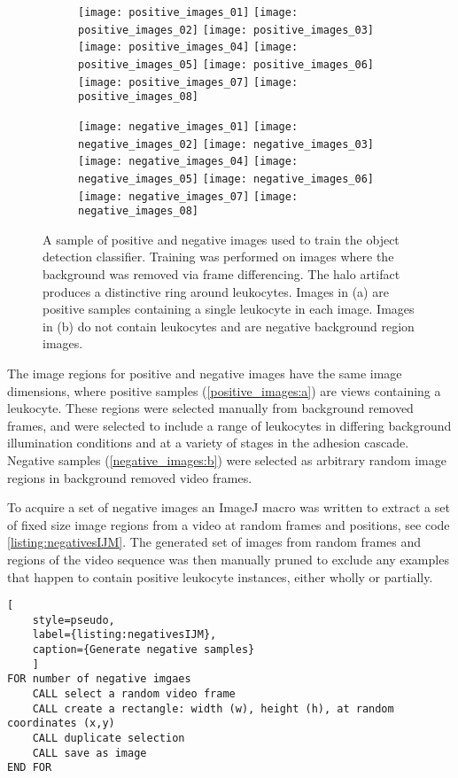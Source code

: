 \begin{figure}[htbp]{}
	\begin{subfigure}[b]{\linewidth}
		\centering
		\texttt{[image: positive\_images\_01]}
		\texttt{[image: positive\_images\_02]}
		\texttt{[image: positive\_images\_03]}
		\texttt{[image: positive\_images\_04]}
		\texttt{[image: positive\_images\_05]}
		\texttt{[image: positive\_images\_06]}
		\texttt{[image: positive\_images\_07]}
		\texttt{[image: positive\_images\_08]}
		\caption{}
		\label{positive_images:a}
	\end{subfigure}
	\begin{subfigure}[b]{\linewidth}
		\centering
		\texttt{[image: negative\_images\_01]}
		\texttt{[image: negative\_images\_02]}
		\texttt{[image: negative\_images\_03]}
		\texttt{[image: negative\_images\_04]}
		\texttt{[image: negative\_images\_05]}
		\texttt{[image: negative\_images\_06]}
		\texttt{[image: negative\_images\_07]}
		\texttt{[image: negative\_images\_08]}
		\caption{}
		\label{negative_images:b}
	\end{subfigure}
\caption[Classifier training samples]{A sample of positive and negative images used to train the object detection classifier. Training was performed on images where the background was removed via frame differencing. The halo artifact produces a distinctive ring around leukocytes. Images in (a) are positive samples containing a single leukocyte in each image. Images in (b) do not contain leukocytes and are negative background region images.}
\label{figure:classifier_samples}
\end{figure}

The image regions for positive and negative images have the same image dimensions, where positive samples (\autoref{positive_images:a}) are views containing a leukocyte. These regions were selected manually from background removed frames, and were selected to include a range of leukocytes in differing background illumination conditions and at a variety of stages in the adhesion cascade. Negative samples (\autoref{negative_images:b}) were selected as arbitrary random image regions in background removed video frames.

To acquire a set of negative images an ImageJ macro was written to extract a set of fixed size image regions from a video at random frames and positions, see code \autoref{listing:negativesIJM}. The generated set of images from random frames and regions of the video sequence was then manually pruned to exclude any examples that happen to contain positive leukocyte instances, either wholly or partially.
\begin{lstlisting}[
	style=pseudo,
	label={listing:negativesIJM},
	caption={Generate negative samples}
	]
FOR number of negative imgaes
	CALL select a random video frame
	CALL create a rectangle: width (w), height (h), at random coordinates (x,y)
	CALL duplicate selection
	CALL save as image
END FOR
\end{lstlisting}

